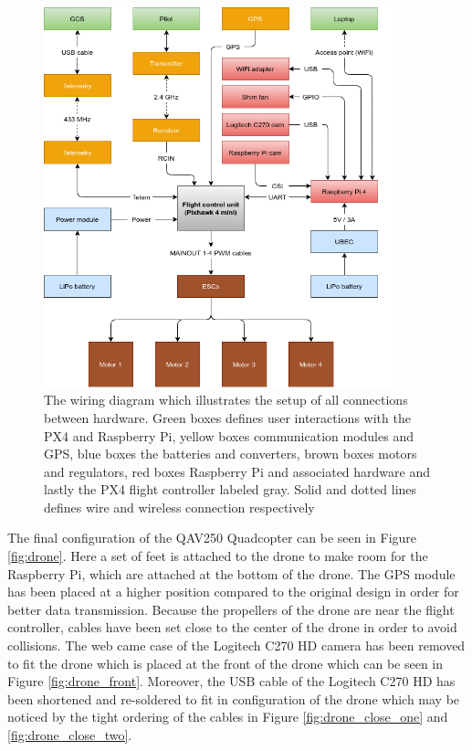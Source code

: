 \documentclass[../Head/report.tex]{subfiles}
\begin{document}
\begin{figure}[H]
    \centering
     \includegraphics[height=11.0cm]{../Figures/power_system/power_system.png}
    \caption{The wiring diagram which illustrates the setup of all connections between hardware. Green boxes defines user interactions with the PX4 and Raspberry Pi, yellow boxes communication modules and GPS, blue boxes the batteries and converters, brown boxes motors and regulators, red boxes Raspberry Pi and associated hardware and lastly the PX4 flight controller labeled gray. Solid and dotted lines defines wire and wireless connection respectively}
    \label{fig:wiring_diagram}
\end{figure}

The final configuration of the QAV250 Quadcopter can be seen in Figure \ref{fig:drone}. Here a set of feet is attached to the drone to make room for the Raspberry Pi, which are attached at the bottom of the drone. The GPS module has been placed at a higher position compared to the original design in order for better data transmission. Because the propellers of the drone are near the flight controller, cables have been set close to the center of the drone in order to avoid collisions. The web came case of the Logitech C270 HD camera has been removed to fit the drone which is placed at the front of the drone which can be seen in Figure \ref{fig:drone_front}. Moreover, the USB cable of the Logitech C270 HD has been shortened and re-soldered to fit in configuration of the drone which may be noticed by the tight ordering of the cables in Figure \ref{fig:drone_close_one} and \ref{fig:drone_close_two}.    
\end{document}
